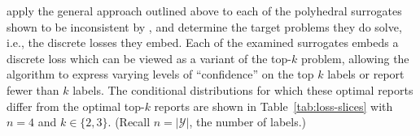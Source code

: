 \documentclass[twoside,11pt]{article}
\newcommand{\Comments}{1}
\newcommand{\mytodo}[2]{\ifnum\Comments=1%
  \todo[linecolor=#1!80!black,backgroundcolor=#1,bordercolor=#1!80!black]{#2}\fi}
\newcommand{\raft}[1]{\mytodo{green!20!white}{RF: #1}}
\newcommand{\jessiet}[1]{\mytodo{teal!20!white}{JF: #1}}
\newcommand{\Y}{\mathcal{Y}}
\begin{document}

\citet{finocchiaro2022consistenttopk} apply the general approach outlined above to each of the polyhedral surrogates shown to be inconsistent by \citeauthor{yang2018consistency}, and determine the target problems they do solve, i.e., the discrete losses they embed.
Each of the examined surrogates embeds a discrete loss which can be viewed as a variant of the top-$k$ problem, allowing the algorithm to express varying levels of ``confidence'' on the top $k$ labels or report fewer than $k$ labels.
The conditional distributions for which these optimal reports differ from the optimal top-$k$ reports are shown in Table~\ref{tab:loss-slices} with $n=4$ and $k \in \{2,3\}$.
(Recall $n=|\Y|$, the number of labels.)
\end{document}
